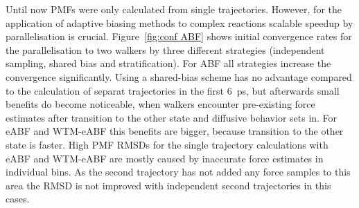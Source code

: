 Until now PMFs were only calculated from single trajectories.
However, for the application of adaptive biasing methods to complex reactions scalable speedup by parallelisation is crucial.
Figure~\ref{fig:conf ABF} shows initial convergence rates for the parallelisation to two walkers by three different strategies (independent sampling, shared bias and stratification).
For ABF all strategies increase the convergence significantly.
Using a shared-bias scheme has no advantage compared to the calculation of separat trajectories in the first 6~ps, but afterwards small benefits do become noticeable, when walkers encounter pre-existing force estimates after transition to the other state and diffusive behavior sets in.
For eABF and WTM-eABF this benefits are bigger, because transition to the other state is faster.
High PMF RMSDs for the single trajectory calculations with eABF and WTM-eABF are mostly caused by inaccurate force estimates in individual bins.
As the second trajectory has not added any force samples to this area the RMSD is not improved with independent second trajectories in this cases.

